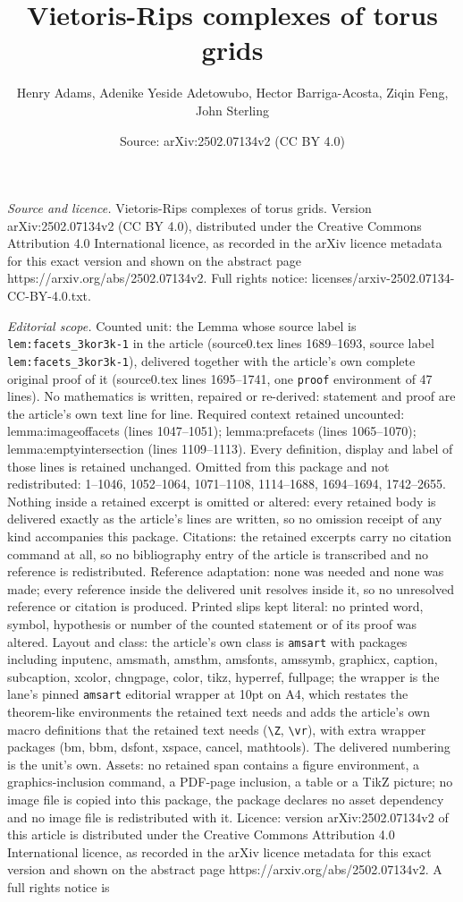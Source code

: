\documentclass[10pt,a4paper]{amsart}
\title[Vietoris-Rips complexes of torus grids]{Vietoris-Rips complexes of torus grids}
\author{Henry Adams, Adenike Yeside Adetowubo, Hector Barriga-Acosta, Ziqin Feng, John Sterling}
\date{Source: arXiv:2502.07134v2 (CC BY 4.0)}
\begin{document}
\maketitle

\noindent\emph{Source and licence.} Vietoris-Rips complexes of torus grids. Version arXiv:2502.07134v2 (CC BY 4.0), distributed under the Creative Commons Attribution 4.0 International licence, as recorded in the arXiv licence metadata for this exact version and shown on the abstract page https://arxiv.org/abs/2502.07134v2. Full rights notice: licenses/arxiv-2502.07134-CC-BY-4.0.txt.\par\smallskip

\noindent\textit{Editorial scope.} Counted unit: the Lemma whose source label is \texttt{lem:facets\_3kor3k-1} in the article (source0.tex lines 1689--1693, source label \texttt{lem:facets\_3kor3k-1}), delivered together with the article's own complete original proof of it (source0.tex lines 1695--1741, one \texttt{proof} environment of 47 lines). No mathematics is written, repaired or re-derived: statement and proof are the article's own text line for line. Required context retained uncounted: lemma:imageoffacets (lines 1047--1051); lemma:prefacets (lines 1065--1070); lemma:emptyintersection (lines 1109--1113). Every definition, display and label of those lines is retained unchanged. Omitted from this package and not redistributed: 1--1046, 1052--1064, 1071--1108, 1114--1688, 1694--1694, 1742--2655. Nothing inside a retained excerpt is omitted or altered: every retained body is delivered exactly as the article's lines are written, so no omission receipt of any kind accompanies this package. Citations: the retained excerpts carry no citation command at all, so no bibliography entry of the article is transcribed and no reference is redistributed. Reference adaptation: none was needed and none was made; every reference inside the delivered unit resolves inside it, so no unresolved reference or citation is produced. Printed slips kept literal: no printed word, symbol, hypothesis or number of the counted statement or of its proof was altered. Layout and class: the article's own class is \texttt{amsart} with packages including inputenc, amsmath, amsthm, amsfonts, amssymb, graphicx, caption, subcaption, xcolor, chngpage, color, tikz, hyperref, fullpage; the wrapper is the lane's pinned \texttt{amsart} editorial wrapper at 10pt on A4, which restates the theorem-like environments the retained text needs and adds the article's own macro definitions that the retained text needs (\texttt{\textbackslash Z}, \texttt{\textbackslash vr}), with extra wrapper packages (bm, bbm, dsfont, xspace, cancel, mathtools). The delivered numbering is the unit's own. Assets: no retained span contains a figure environment, a graphics-inclusion command, a PDF-page inclusion, a table or a TikZ picture; no image file is copied into this package, the package declares no asset dependency and no image file is redistributed with it. Licence: version arXiv:2502.07134v2 of this article is distributed under the Creative Commons Attribution 4.0 International licence, as recorded in the arXiv licence metadata for this exact version and shown on the abstract page https://arxiv.org/abs/2502.07134v2. A full rights notice is 
\end{document}
